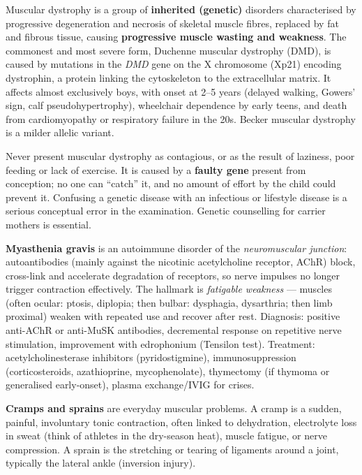 \documentclass[11pt]{article}
\newcommand{\cle}[1]{{\popxbold\color{popdark}#1}}
\begin{document}
\begin{definition}
\cle{Muscular dystrophy} is a group of \textbf{inherited (genetic)} disorders characterised by progressive degeneration and necrosis of skeletal muscle fibres, replaced by fat and fibrous tissue, causing \textbf{progressive muscle wasting and weakness}. The commonest and most severe form, \cle{Duchenne muscular dystrophy (DMD)}, is caused by mutations in the \emph{DMD} gene on the X chromosome (Xp21) encoding \cle{dystrophin}, a protein linking the cytoskeleton to the extracellular matrix. It affects almost exclusively boys, with onset at 2--5 years (delayed walking, Gowers' sign, calf pseudohypertrophy), wheelchair dependence by early teens, and death from cardiomyopathy or respiratory failure in the 20s. Becker muscular dystrophy is a milder allelic variant.
\end{definition}

\begin{attention}
Never present muscular dystrophy as contagious, or as the result of laziness, poor feeding or lack of exercise. It is caused by a \textbf{faulty gene} present from conception; no one can ``catch'' it, and no amount of effort by the child could prevent it. Confusing a genetic disease with an infectious or lifestyle disease is a serious conceptual error in the examination. Genetic counselling for carrier mothers is essential.
\end{attention}

\textbf{Myasthenia gravis} is an \cle{autoimmune} disorder of the \emph{neuromuscular junction}: autoantibodies (mainly against the nicotinic acetylcholine receptor, AChR) block, cross-link and accelerate degradation of receptors, so nerve impulses no longer trigger contraction effectively. The hallmark is \emph{fatigable weakness} — muscles (often ocular: ptosis, diplopia; then bulbar: dysphagia, dysarthria; then limb proximal) weaken with repeated use and recover after rest. Diagnosis: positive anti-AChR or anti-MuSK antibodies, decremental response on repetitive nerve stimulation, improvement with edrophonium (Tensilon test). Treatment: acetylcholinesterase inhibitors (pyridostigmine), immunosuppression (corticosteroids, azathioprine, mycophenolate), thymectomy (if thymoma or generalised early-onset), plasma exchange/IVIG for crises.

\textbf{Cramps and sprains} are everyday muscular problems. A \cle{cramp} is a sudden, painful, involuntary tonic contraction, often linked to dehydration, electrolyte loss in sweat (think of athletes in the dry-season heat), muscle fatigue, or nerve compression. A \cle{sprain} is the stretching or tearing of ligaments around a joint, typically the lateral ankle (inversion injury).
\end{document}
